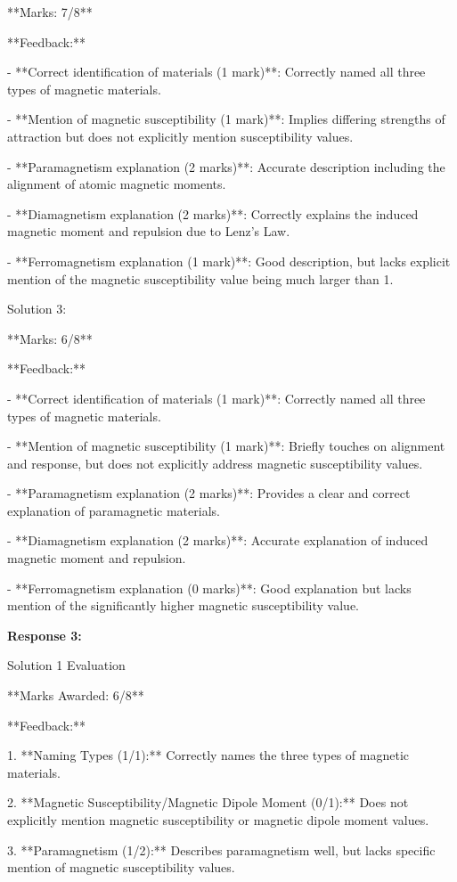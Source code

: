 \documentclass[a4paper,11pt]{article}
\begin{document}
**Marks: 7/8**

**Feedback:**

- **Correct identification of materials (1 mark)**: Correctly named all three types of magnetic materials.

- **Mention of magnetic susceptibility (1 mark)**: Implies differing strengths of attraction but does not explicitly mention susceptibility values.

- **Paramagnetism explanation (2 marks)**: Accurate description including the alignment of atomic magnetic moments.

- **Diamagnetism explanation (2 marks)**: Correctly explains the induced magnetic moment and repulsion due to Lenz's Law.

- **Ferromagnetism explanation (1 mark)**: Good description, but lacks explicit mention of the magnetic susceptibility value being much larger than 1.

Solution 3:

**Marks: 6/8**

**Feedback:**

- **Correct identification of materials (1 mark)**: Correctly named all three types of magnetic materials.

- **Mention of magnetic susceptibility (1 mark)**: Briefly touches on alignment and response, but does not explicitly address magnetic susceptibility values.

- **Paramagnetism explanation (2 marks)**: Provides a clear and correct explanation of paramagnetic materials.

- **Diamagnetism explanation (2 marks)**: Accurate explanation of induced magnetic moment and repulsion.

- **Ferromagnetism explanation (0 marks)**: Good explanation but lacks mention of the significantly higher magnetic susceptibility value.

\bigskip    
\textbf{Response 3:}

Solution 1 Evaluation

**Marks Awarded: 6/8**

**Feedback:**

1. **Naming Types (1/1):** Correctly names the three types of magnetic materials.

2. **Magnetic Susceptibility/Magnetic Dipole Moment (0/1):** Does not explicitly mention magnetic susceptibility or magnetic dipole moment values.

3. **Paramagnetism (1/2):** Describes paramagnetism well, but lacks specific mention of magnetic susceptibility values.
\end{document}
